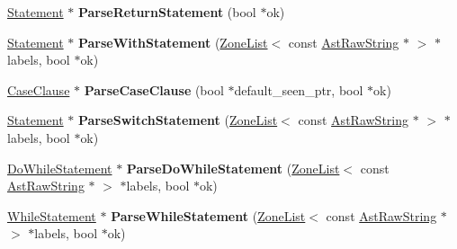 \begin{DoxyCompactItemize}
\item 
\hyperlink{classv8_1_1internal_1_1_statement}{Statement} $\ast$ {\bfseries Parse\+Return\+Statement} (bool $\ast$ok)\hypertarget{classv8_1_1internal_1_1_parser_a0870941d68226703ab1a9576ba169781}{}\label{classv8_1_1internal_1_1_parser_a0870941d68226703ab1a9576ba169781}

\item 
\hyperlink{classv8_1_1internal_1_1_statement}{Statement} $\ast$ {\bfseries Parse\+With\+Statement} (\hyperlink{classv8_1_1internal_1_1_zone_list}{Zone\+List}$<$ const \hyperlink{classv8_1_1internal_1_1_ast_raw_string}{Ast\+Raw\+String} $\ast$ $>$ $\ast$labels, bool $\ast$ok)\hypertarget{classv8_1_1internal_1_1_parser_abbc54651c55e786bd63ff18cc39cb099}{}\label{classv8_1_1internal_1_1_parser_abbc54651c55e786bd63ff18cc39cb099}

\item 
\hyperlink{classv8_1_1internal_1_1_case_clause}{Case\+Clause} $\ast$ {\bfseries Parse\+Case\+Clause} (bool $\ast$default\+\_\+seen\+\_\+ptr, bool $\ast$ok)\hypertarget{classv8_1_1internal_1_1_parser_a83bc0b81aa82d64e8c029b7d11576760}{}\label{classv8_1_1internal_1_1_parser_a83bc0b81aa82d64e8c029b7d11576760}

\item 
\hyperlink{classv8_1_1internal_1_1_statement}{Statement} $\ast$ {\bfseries Parse\+Switch\+Statement} (\hyperlink{classv8_1_1internal_1_1_zone_list}{Zone\+List}$<$ const \hyperlink{classv8_1_1internal_1_1_ast_raw_string}{Ast\+Raw\+String} $\ast$ $>$ $\ast$labels, bool $\ast$ok)\hypertarget{classv8_1_1internal_1_1_parser_af4bc8a1e867db17fd719a70a68735ad0}{}\label{classv8_1_1internal_1_1_parser_af4bc8a1e867db17fd719a70a68735ad0}

\item 
\hyperlink{classv8_1_1internal_1_1_do_while_statement}{Do\+While\+Statement} $\ast$ {\bfseries Parse\+Do\+While\+Statement} (\hyperlink{classv8_1_1internal_1_1_zone_list}{Zone\+List}$<$ const \hyperlink{classv8_1_1internal_1_1_ast_raw_string}{Ast\+Raw\+String} $\ast$ $>$ $\ast$labels, bool $\ast$ok)\hypertarget{classv8_1_1internal_1_1_parser_adda752fb22fc60075ecad13df11ebe38}{}\label{classv8_1_1internal_1_1_parser_adda752fb22fc60075ecad13df11ebe38}

\item 
\hyperlink{classv8_1_1internal_1_1_while_statement}{While\+Statement} $\ast$ {\bfseries Parse\+While\+Statement} (\hyperlink{classv8_1_1internal_1_1_zone_list}{Zone\+List}$<$ const \hyperlink{classv8_1_1internal_1_1_ast_raw_string}{Ast\+Raw\+String} $\ast$ $>$ $\ast$labels, bool $\ast$ok)\hypertarget{classv8_1_1internal_1_1_parser_a4b28959c61cfa612d58322bc77cda1b0}{}\label{classv8_1_1internal_1_1_parser_a4b28959c61cfa612d58322bc77cda1b0}


\end{DoxyCompactItemize}

